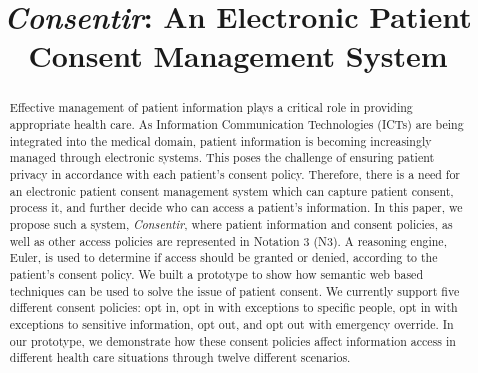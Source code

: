 \documentclass[conference]{IEEEtran}
\begin{document}
\title{\textit{Consentir}: An Electronic Patient Consent Management System}

\author{
}

\maketitle


\begin{abstract}
Effective management of patient information plays a critical role in providing appropriate health care. As Information Communication Technologies (ICTs) are being integrated into the medical
domain, patient information is becoming increasingly managed through electronic systems. This poses the challenge of ensuring patient privacy in accordance with each patient's consent policy. Therefore, there is a need for an electronic patient consent management
system which can capture patient consent, process it, and further decide who can access a patient's information. In this paper, we propose such a system, \textit{Consentir}, where patient information and consent policies, as well as other access policies are represented in Notation 3 (N3). A reasoning engine, Euler, is used to determine if access should be granted or denied, according to the patient's consent policy. We built a prototype to show how semantic web based techniques can be used to solve the issue of patient consent.  We currently support five different consent policies: opt in, opt in with exceptions to specific people, opt in with exceptions to sensitive information, opt out, and opt out with emergency override. In our prototype, we demonstrate how these consent policies affect information access in different health care situations through twelve different scenarios.
\end{abstract}
\end{document}
